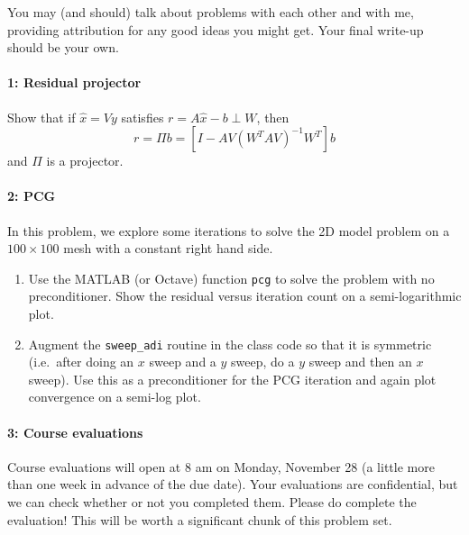 \documentclass[12pt, leqno]{article} %
\begin{document}

You may (and should) talk about problems with each other and with me,
providing attribution for any good ideas you might get.  Your final
write-up should be your own.

\paragraph*{1: Residual projector}
Show that if $\hat{x} = Vy$ satisfies $r = A\hat{x}-b \perp W$, then
\[
  r = \Pi b = \left[I-AV(W^TAV)^{-1} W^T\right] b
\]
and $\Pi$ is a projector.

\paragraph*{2: PCG}
In this problem, we explore some iterations to solve the 2D model
problem on a $100 \times 100$ mesh with a constant right hand side.
\begin{enumerate}
\item Use the MATLAB (or Octave) function {\tt pcg} to solve the
  problem with no preconditioner.  Show the residual versus iteration
  count on a semi-logarithmic plot.
\item Augment the {\tt sweep\_adi} routine in the class code so that
  it is symmetric (i.e.~after doing an $x$ sweep and a $y$ sweep,
  do a $y$ sweep and then an $x$ sweep).  Use this as a preconditioner
  for the PCG iteration and again plot convergence on a semi-log plot.
\end{enumerate}

\paragraph*{3: Course evaluations}
Course evaluations will open at 8 am on Monday, November 28 (a little
more than one week in advance of the due date).  Your evaluations are
confidential, but we can check whether or not you completed them.
Please do complete the evaluation!  This will be worth a significant
chunk of this problem set.
\end{document}
